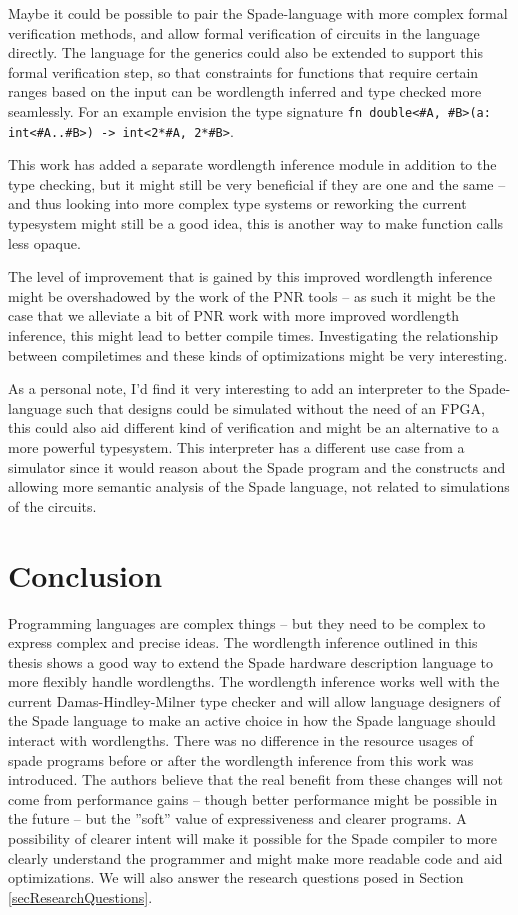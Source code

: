 Maybe it could be possible to pair the Spade-language with more complex formal verification methods, and allow formal verification of circuits in the language directly. The language for the generics could also be extended to support this formal verification step, so that constraints for functions that require certain ranges based on the input can be wordlength inferred and type checked more seamlessly. For an example envision the type signature \verb+fn double<#A, #B>(a: int<#A..#B>) -> int<2*#A, 2*#B>+.

This work has added a separate wordlength inference module in addition to the type checking, but it might still be very beneficial if they are one and the same -- and thus looking into more complex type systems or reworking the current typesystem might still be a good idea, this is another way to make function calls less opaque.

The level of improvement that is gained by this improved wordlength inference might be overshadowed by the work of the PNR tools -- as such it might be the case that we alleviate a bit of PNR work with more improved wordlength inference, this might lead to better compile times. Investigating the relationship between compiletimes and these kinds of optimizations might be very interesting.

As a personal note, I'd find it very interesting to add an interpreter to the Spade-language such that designs could be simulated without the need of an FPGA, this could also aid different kind of verification and might be an alternative to a more powerful typesystem. This interpreter has a different use case from a simulator since it would reason about the Spade program and the constructs and allowing more semantic analysis of the Spade language, not related to simulations of the circuits.

\chapter{Conclusion}
\label{cha:Conclusion}
Programming languages are complex things -- but they need to be complex to express complex and precise ideas. The wordlength inference outlined in this thesis shows a good way to extend the Spade hardware description language to more flexibly handle wordlengths. The wordlength inference works well with the current Damas-Hindley-Milner type checker and will allow language designers of the Spade language to make an active choice in how the Spade language should interact with wordlengths. There was no difference in the resource usages of spade programs before or after the wordlength inference from this work was introduced. The authors believe that the real benefit from these changes will not come from performance gains -- though better performance might be possible in the future -- but the ''soft'' value of expressiveness and clearer programs. A possibility of clearer intent will make it possible for the Spade compiler to more clearly understand the programmer and might make more readable code and aid optimizations. We will also answer the research questions posed in Section \ref{secResearchQuestions}.


